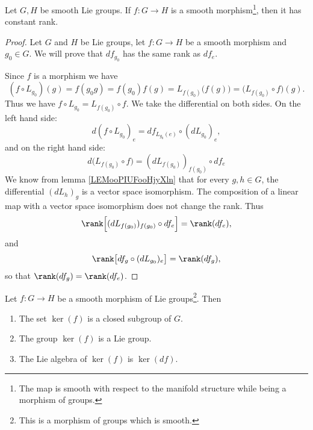 \begin{proposition}        \label{PROPooIORNooLeuXPW}
    Let \( G,H\) be smooth Lie groups. If \( f\colon G\to H\) is a smooth morphism\footnote{The map is smooth with respect to the manifold structure while being a morphism of groups.}, then it has constant rank.
\end{proposition}

\begin{proof}
    Let \( G\) and \( H\) be Lie groups, let \( f\colon G\to H\) be a smooth morphism and \( g_0\in G\). We will prove that \( df_{g_0}\) has the same rank as \( df_e\).

    Since \( f\) is a morphism we have
    \begin{equation}
        (f\circ L_{g_0})(g)=f(g_0g)=f(g_0)f(g)=L_{f(g_0)}\big( f(g) \big)=\big( L_{f(g_0)}\circ f \big)(g).
    \end{equation}
    Thus we have \( f\circ L_{g_0}=L_{f(g_0)}\circ f\). We take the differential on both sides. On the left hand side:
    \begin{equation}
        d(f\circ L_{g_0})_e=df_{L_{g_0}(e)}\circ(dL_{g_0})_e,
    \end{equation}
    and on the right hand side:
    \begin{equation}
        d\big( L_{f(g_0)}\circ f \big)=(dL_{f(g_0)})_{f(g_0)}\circ df_e
    \end{equation}
    We know from lemma \ref{LEMooPIUFooHjyXln} that for every \( g,h\in G\), the differential \( (dL_h)_g\) is a vector space isomorphism. The composition of a linear map with a vector space isomorphism does not change the rank. Thus
    \begin{equation}
        \rank\Big[ (dL_{f(g_0)})_{f(g_0)}\circ df_e \Big]=\rank(df_e),
    \end{equation}
    and 
    \begin{equation}
        \rank\big[ df_g\circ(dL_{g_0})_e \big]=\rank(df_g),
    \end{equation}
    so that \( \rank(df_g)=\rank(df_e)\).
\end{proof}

\begin{proposition}    
    Let \( f\colon G\to H\) be a smooth morphism of Lie groups\footnote{This is a morphism of groups which is smooth.}. Then
    \begin{enumerate}
        \item
            The set \( \ker(f)\) is a closed subgroup of \( G\).
        \item
            The group \( \ker(f)\) is a Lie group.
        \item
            The Lie algebra of \( \ker(f)\) is \( \ker(df)\).
    \end{enumerate}
\end{proposition}

